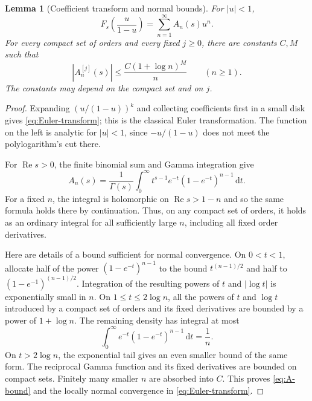 \documentclass[11pt]{article}
\numberwithin{equation}{section}
\newtheorem{lemma}[theorem]{Lemma}
\theoremstyle{definition}
\DeclareMathOperator{\Rea}{Re}
\newcommand{\dd}{\,\mathrm d}
\begin{document}
\begin{lemma}[Coefficient transform and normal bounds]\label{lem:Newton}
For $|u|<1$,
\begin{equation}\label{eq:Euler-transform}
 F_s\!\left(\frac{u}{1-u}\right)=\sum_{n=1}^\infty A_n(s)u^n.
\end{equation}
For every compact set of orders and every fixed $j\ge0$, there are constants $C,M$ such that
\begin{equation}\label{eq:A-bound}
 |A_n^{[j]}(s)|\le \frac{C(1+\log n)^M}{n}\qquad(n\ge1).
\end{equation}
The constants may depend on the compact set and on $j$.
\end{lemma}
\begin{proof}
Expanding $(u/(1-u))^k$ and collecting coefficients first in a small disk gives \eqref{eq:Euler-transform}; this is the classical Euler transformation. The function on the left is analytic for $|u|<1$, since $-u/(1-u)$ does not meet the polylogarithm's cut there.

For $\Rea s>0$, the finite binomial sum and Gamma integration give
\begin{equation}\label{eq:A-Mellin}
 A_n(s)=\frac1{\Gamma(s)}\int_0^\infty t^{s-1}e^{-t}(1-e^{-t})^{n-1}\dd t.
\end{equation}
For a fixed $n$, the integral is holomorphic on $\Rea s>1-n$ and so the same formula holds there by continuation. Thus, on any compact set of orders, it holds as an ordinary integral for all sufficiently large $n$, including all fixed order derivatives.

Here are details of a bound sufficient for normal convergence. On $0<t<1$, allocate half of the power $(1-e^{-t})^{n-1}$ to the bound $t^{(n-1)/2}$ and half to $(1-e^{-1})^{(n-1)/2}$. Integration of the resulting powers of $t$ and $|\log t|$ is exponentially small in $n$. On $1\le t\le2\log n$, all the powers of $t$ and $\log t$ introduced by a compact set of orders and its fixed derivatives are bounded by a power of $1+\log n$. The remaining density has integral at most
\[
 \int_0^\infty e^{-t}(1-e^{-t})^{n-1}\dd t=\frac1n.
\]
On $t>2\log n$, the exponential tail gives an even smaller bound of the same form. The reciprocal Gamma function and its fixed derivatives are bounded on compact sets. Finitely many smaller $n$ are absorbed into $C$. This proves \eqref{eq:A-bound} and the locally normal convergence in \eqref{eq:Euler-transform}.
\end{proof}
\end{document}
